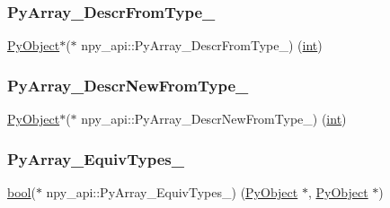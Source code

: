 \mbox{\label{structnpy__api_a089f8b2eff652a6be196a4a272fda631}} 
\subsubsection{\texorpdfstring{PyArray\_DescrFromType\_}{PyArray\_DescrFromType\_}}
{\footnotesize\ttfamily \mbox{\hyperlink{_python27_2object_8h_aadc84ac7aed2cfa6f20c25f62bf3dac7}{Py\+Object}}$\ast$($\ast$ npy\+\_\+api\+::\+Py\+Array\+\_\+\+Descr\+From\+Type\+\_\+) (\mbox{\hyperlink{warnings_8h_a74f207b5aa4ba51c3a2ad59b219a423b}{int}})}

\mbox{\label{structnpy__api_ad040b3ea314996f78176f7a5ddb29177}} 
\subsubsection{\texorpdfstring{PyArray\_DescrNewFromType\_}{PyArray\_DescrNewFromType\_}}
{\footnotesize\ttfamily \mbox{\hyperlink{_python27_2object_8h_aadc84ac7aed2cfa6f20c25f62bf3dac7}{Py\+Object}}$\ast$($\ast$ npy\+\_\+api\+::\+Py\+Array\+\_\+\+Descr\+New\+From\+Type\+\_\+) (\mbox{\hyperlink{warnings_8h_a74f207b5aa4ba51c3a2ad59b219a423b}{int}})}

\mbox{\label{structnpy__api_a679481716d90329a4a5af98fab660a9b}} 
\subsubsection{\texorpdfstring{PyArray\_EquivTypes\_}{PyArray\_EquivTypes\_}}
{\footnotesize\ttfamily \mbox{\hyperlink{asdl_8h_af6a258d8f3ee5206d682d799316314b1}{bool}}($\ast$ npy\+\_\+api\+::\+Py\+Array\+\_\+\+Equiv\+Types\+\_\+) (\mbox{\hyperlink{_python27_2object_8h_aadc84ac7aed2cfa6f20c25f62bf3dac7}{Py\+Object}} $\ast$, \mbox{\hyperlink{_python27_2object_8h_aadc84ac7aed2cfa6f20c25f62bf3dac7}{Py\+Object}} $\ast$)}

\mbox{\label{structnpy__api_a52ea8d3ec3807fbbe3677778927be208}} 
